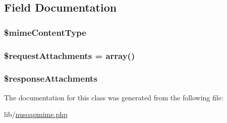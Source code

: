 \subsection{Field Documentation}
\hypertarget{classnusoap__client__mime_afca41a43fc6c89107faf7c34a5dedb32}{}
\subsubsection[{\$mime\+Content\+Type}]{\setlength{\rightskip}{0pt plus 5cm}\$mime\+Content\+Type}\label{classnusoap__client__mime_afca41a43fc6c89107faf7c34a5dedb32}
\hypertarget{classnusoap__client__mime_ac58af5d0476b202790c63410360c4696}{}
\subsubsection[{\$request\+Attachments}]{\setlength{\rightskip}{0pt plus 5cm}\$request\+Attachments = array()}\label{classnusoap__client__mime_ac58af5d0476b202790c63410360c4696}
\hypertarget{classnusoap__client__mime_a065527a5618c8bb7597a79b33b410a6e}{}
\subsubsection[{\$response\+Attachments}]{\setlength{\rightskip}{0pt plus 5cm}\$response\+Attachments}\label{classnusoap__client__mime_a065527a5618c8bb7597a79b33b410a6e}


The documentation for this class was generated from the following file\+:\begin{DoxyCompactItemize}
\item 
lib/\hyperlink{nusoapmime_8php}{nusoapmime.\+php}\end{DoxyCompactItemize}
